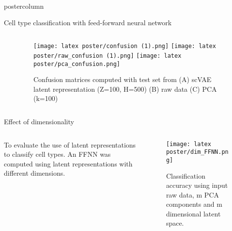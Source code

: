 \documentclass[final,hyperref={pdfpagelabels=false}]{beamer}
\begin{document}
\begin{frame}
\begin{columns}
\begin{column}{.49\paperwidth}
\begin{beamercolorbox}[center,wd=\textwidth]{postercolumn}
\begin{minipage}[T]{.99\textwidth}
{\begin{block}{Cell type classification with feed-forward neural network}
\begin{columns}
\begin{column}{0.49\textwidth}
\begin{minipage}[t]{.95\textwidth}
\end{minipage}

\end{column}
\begin{column}{0.49\textwidth}
\centering
\centering
\begin{minipage}[t]{.95\textwidth}


\begin{figure}
\texttt{[image: latex poster/confusion (1).png]}
\texttt{[image: latex poster/raw\_confusion (1).png]}
\texttt{[image: latex poster/pca\_confusion.png]}
 \caption{Confusion matrices computed with test set from (A) scVAE latent representation (Z=100, H=500) (B) raw data (C) PCA (k=100)}
 \label{figure:confusion}
\end{figure}  
\end{minipage}
\end{column}
\end{columns}
\end{block}

\vfill

\begin{block}{Effect of dimensionality}

\begin{columns}
\begin{column}{0.40\textwidth}
\centering
\begin{minipage}[t]{.90\textwidth}

\small{To evaluate the use of latent 
representations to classify cell types.
An FFNN was computed using latent representations with different dimensions.\\}
  

\end{minipage}
\end{column}

\begin{column}{0.60\textwidth}
\begin{minipage}[t]{.95\textwidth}
\centering
\begin{figure}
\texttt{[image: latex poster/dim\_FFNN.png]}
 \caption{Classification accuracy using input raw data, m PCA components and m dimensional latent space.}
 \end{figure} 
\end{minipage}
\end{column}
\end{columns}
\vspace{0.4cm}
\end{block}	
\vfill


}
\end{minipage}
\end{beamercolorbox}
\end{column}
\end{columns}
\end{frame}
\end{document}
